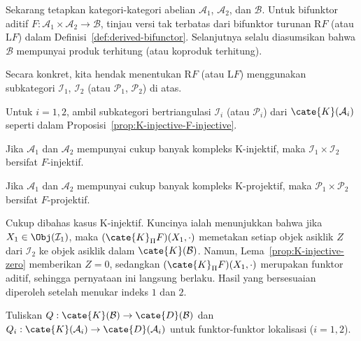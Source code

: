 Sekarang tetapkan kategori-kategori abelian $\mathcal{A}_1$, $\mathcal{A}_2$,
dan $\mathcal{B}$. Untuk bifunktor aditif
$F:\mathcal{A}_1\times\mathcal{A}_2\to\mathcal{B}$, tinjau versi tak
terbatas dari bifunktor turunan $\mathrm{R}F$ (atau $\mathrm{L}F$) dalam
Definisi~\ref{def:derived-bifunctor}. Selanjutnya selalu diasumsikan bahwa
$\mathcal{B}$ mempunyai produk terhitung (atau koproduk terhitung).

Secara konkret, kita hendak menentukan $\mathrm{R}F$ (atau $\mathrm{L}F$)
menggunakan subkategori $\mathcal{I}_1$, $\mathcal{I}_2$ (atau
$\mathcal{P}_1$, $\mathcal{P}_2$) di atas.

\begin{lema}\label{prop:bifunctor-via-K-injective-prep}
	Untuk $i=1,2$, ambil subkategori bertriangulasi $\mathcal{I}_i$ (atau
	$\mathcal{P}_i$) dari $\cate{K}(\mathcal{A}_i)$ seperti dalam
	Proposisi~\ref{prop:K-injective-F-injective}.
	\begin{compactitem}
		\item Jika $\mathcal{A}_1$ dan $\mathcal{A}_2$ mempunyai cukup banyak
		kompleks K-injektif, maka $\mathcal{I}_1\times\mathcal{I}_2$ bersifat
		$F$-injektif.
		\item Jika $\mathcal{A}_1$ dan $\mathcal{A}_2$ mempunyai cukup banyak
		kompleks K-projektif, maka $\mathcal{P}_1\times\mathcal{P}_2$ bersifat
		$F$-projektif.
	\end{compactitem}
\end{lema}
\begin{bukti}
	Cukup dibahas kasus K-injektif. Kuncinya ialah menunjukkan bahwa jika
	$X_1\in\Obj(\mathcal{I}_1)$, maka
	$(\cate{K}_{\Pi}F)(X_1,\cdot)$ memetakan setiap objek asiklik $Z$ dari
	$\mathcal{I}_2$ ke objek asiklik dalam $\cate{K}(\mathcal{B})$. Namun,
	Lema~\ref{prop:K-injective-zero} memberikan $Z=0$, sedangkan
	$(\cate{K}_{\Pi}F)(X_1,\cdot)$ merupakan funktor aditif, sehingga pernyataan
	ini langsung berlaku. Hasil yang bersesuaian diperoleh setelah menukar indeks
	$1$ dan $2$.
\end{bukti}

Tuliskan $Q:\cate{K}(\mathcal{B})\to\cate{D}(\mathcal{B})$ dan
$Q_i:\cate{K}(\mathcal{A}_i)\to\cate{D}(\mathcal{A}_i)$ untuk
funktor-funktor lokalisasi ($i=1,2$).

